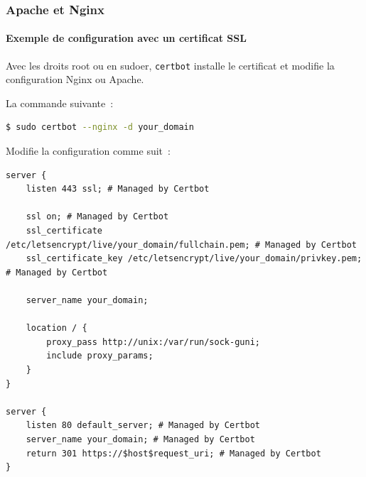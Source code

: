 \documentclass{beamer}
\begin{document}
    \begin{frame}[fragile]
        \transdissolve
        \frametitle{Apache et Nginx}
        \framesubtitle{Exemple de configuration avec un certificat SSL}
        Avec les droits root ou en sudoer, \lstinline{certbot} installe le certificat et modifie la configuration Nginx ou Apache.

        La commande suivante~:
        \begin{lstlisting}[language=bash,basicstyle=\ttfamily\tiny]
$ sudo certbot --nginx -d your_domain
        \end{lstlisting}
        Modifie la configuration comme suit~:
        \begin{lstlisting}[basicstyle=\ttfamily\tiny]
server {
    listen 443 ssl; # Managed by Certbot

    ssl on; # Managed by Certbot
    ssl_certificate     /etc/letsencrypt/live/your_domain/fullchain.pem; # Managed by Certbot
    ssl_certificate_key /etc/letsencrypt/live/your_domain/privkey.pem; # Managed by Certbot

    server_name your_domain;

    location / {
        proxy_pass http://unix:/var/run/sock-guni;
        include proxy_params;
    }
}

server {
    listen 80 default_server; # Managed by Certbot
    server_name your_domain; # Managed by Certbot
    return 301 https://$host$request_uri; # Managed by Certbot
}
        \end{lstlisting}
    \end{frame}
\end{document}
